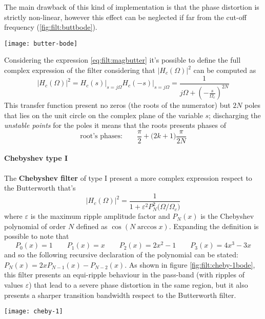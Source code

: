 	The main drawback of this kind of implementation is that the phase distortion is strictly non-linear, however this effect can be neglected if far from the cut-off frequency (\ref{fig:filt:buttbode}).
	
	\begin{SCfigure}[2][bht]
		\centering \texttt{[image: butter-bode]}
		\caption{Bode plots of the response of the Butterworth filter.} \label{fig:filt:buttbode}
	\end{SCfigure}

	Considering the expression \ref{eq:filt:magbutter} it's possible to define the full complex expression of the filter considering that $|H_c(\Omega)|^2$ can be computed as
	\[ |H_c(\Omega)|^2 = H_c(s)\Big|_{s=j\Omega} H_c(-s)\Big|_{s=j\Omega} = \frac{1}{j\Omega + \left( -\frac {s}{\Omega_c} \right)^{2N} }\]
	This transfer function present no zeros (the roots of the numerator) but $2N$ poles that lies on the unit circle on the complex plane of the variable $s$; discharging the \textit{unstable points} for the poles it means that the roots presents phases of
	\[ \textrm{root's phases:} \qquad \frac \pi 2 + \big(2k+1\big) \frac{\pi}{2N}  \]
	
	
	\paragraph{Chebyshev type I} The \textbf{Chebyshev filter} of type I present a more complex expression respect to the Butterworth that's
	\begin{equation}
		\big|H_c(\Omega)\big|^2 = \frac 1 { 1 + \varepsilon^ 2 P_N^2 \big(\Omega/\Omega_c\big) }
	\end{equation}
	where $\varepsilon$ is the maximum ripple amplitude factor and $P_N(x)$ is the Chebyshev polynomial of order $N$ defined as $\cos (N\arccos x)$. Expanding the definition is possible to note that
	\[ P_0(x) = 1 \qquad P_1(x) = x \qquad P_2(x) = 2x^2-1 \qquad P_3(x) = 4x^3-3x \]
	and so the following recursive declaration of the polynomial can be stated: $P_N(x) = 2x P_{N-1}(x) - P_{N-2}(x)$. As shown in figure \ref{fig:filt:cheby-1bode}, this filter presents an equi-ripple behaviour in the pass-band (with ripples of values $\varepsilon$) that lead to a severe phase distortion in the same region, but it also presents a sharper transition bandwidth respect to the Butterworth filter.
	
	\begin{SCfigure}[2][bht]
		\centering \texttt{[image: cheby-1]}
		\caption{Bode plots of the response of the Chebyshev type I filter.} \label{fig:filt:cheby-1bode}
	\end{SCfigure}
	

